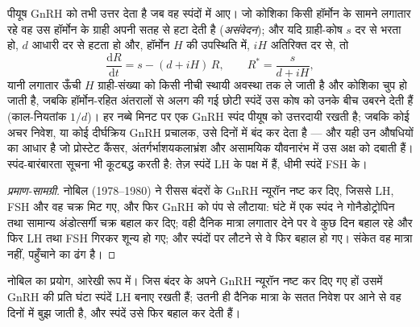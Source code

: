 \begin{proposition}[स्पंद क्यों मायने रखते हैं]\label{prop:b2:reproductive-hormones:pulses}
पीयूष GnRH को तभी उत्तर देता है जब वह स्पंदों में आए। जो कोशिका
किसी हॉर्मोन के सामने लगातार रहे वह उस हॉर्मोन के ग्राही अपनी सतह से
हटा देती है (\emph{असंवेदन}); और यदि ग्राही-कोष $s$ दर से भरता हो,
$d$ आधारी दर से हटता हो और, हॉर्मोन $H$ की उपस्थिति में, $iH$ अतिरिक्त
दर से, तो
\[
\frac{\mathrm{d}R}{\mathrm{d}t} = s - (d + iH)\,R, \qquad R^* = \frac{s}{d + iH},
\]
यानी लगातार ऊँची $H$ ग्राही-संख्या को किसी नीची स्थायी अवस्था तक ले
जाती है और कोशिका चुप हो जाती है, जबकि हॉर्मोन-रहित अंतरालों से अलग
की गई छोटी स्पंदें उस कोष को उनके बीच उबरने देती हैं
(काल-नियतांक $1/d$)। हर नब्बे मिनट पर एक GnRH स्पंद
पीयूष को उत्तरदायी रखती है; जबकि कोई अचर निवेश, या कोई
दीर्घक्रिय GnRH प्रचालक, उसे दिनों में बंद कर देता है --- और यही उन
औषधियों का आधार है जो प्रोस्टेट कैंसर, अंतर्गर्भाशयकलाभ्रंश और
असामयिक यौवनारंभ में उस अक्ष को दबाती हैं। स्पंद-बारंबारता सूचना भी
कूटबद्ध करती है: तेज़ स्पंदें LH के पक्ष में हैं, धीमी स्पंदें FSH के।
\end{proposition}
\begin{proof}[प्रमाण-सामग्री]
नोबिल (1978--1980) ने रीसस बंदरों के GnRH न्यूरॉन नष्ट कर दिए,
जिससे LH, FSH और वह चक्र मिट गए, और फिर GnRH को पंप से
लौटाया: घंटे में एक स्पंद ने गोनैडोट्रोपिन तथा सामान्य
अंडोत्सर्गी चक्र बहाल कर दिए; वही दैनिक मात्रा लगातार देने पर वे कुछ
दिन बहाल रहे और फिर LH तथा FSH गिरकर शून्य हो गए; और स्पंदों पर
लौटने से वे फिर बहाल हो गए। संकेत वह मात्रा नहीं, पहुँचाने का ढंग है।
\end{proof}

\begin{omfigure}

{\small नोबिल का प्रयोग, आरेखी रूप में। जिस बंदर के अपने
GnRH न्यूरॉन नष्ट कर दिए गए हों उसमें GnRH की प्रति घंटा स्पंदें LH
बनाए रखती हैं; उतनी ही दैनिक मात्रा के सतत निवेश पर आने से
वह दिनों में बुझ जाती है, और स्पंदें उसे फिर बहाल कर देती हैं।}
\end{omfigure}

